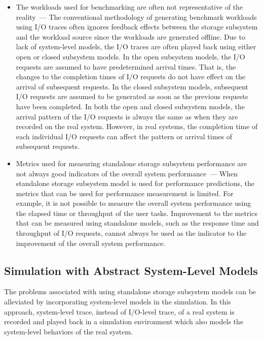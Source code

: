 \begin{itemize}
	\item The workloads used for benchmarking are often not representative of the reality~--- The conventional methodology of generating benchmark workloads using I/O traces often ignores feedback effects between the storage subsystem and the workload source since the workloads are generated offline. Due to lack of system-level models, the I/O traces are often played back using either open or closed subsystem models. In the open subsystem models, the I/O requests are assumed to have predetermined arrival times. That is, the changes to the completion times of I/O requests do not have effect on the arrival of subsequent requests. In the closed subsystem models, subsequent I/O requests are assumed to be generated as soon as the previous requests have been completed. In both the open and closed subsystem models, the arrival pattern of the I/O requests is always the same as when they are recorded on the real system. However, in real systems, the completion time of each individual I/O requests can affect the pattern or arrival times of subsequent requests.

	\item Metrics used for measuring standalone storage subsystem performance are not always good indicators of the overall system performance~--- When standalone storage subsystem model is used for performance predictions, the metrics that can be used for performance measurement is limited. For example, it is not possible to measure the overall system performance using the elapsed time or throughput of the user tasks. Improvement to the metrics that can be measured using standalone models, such as the response time and throughput of I/O requests, cannot always be used as the indicator to the improvement of the overall system performance.
\end{itemize}

\subsection{Simulation with Abstract System-Level Models}

The problems associated with using standalone storage subsystem models can be alleviated by incorporating system-level models in the simulation. In this approach, system-level trace, instead of I/O-level trace, of a real system is recorded and played back in a simulation environment which also models the system-level behaviors of the real system.

